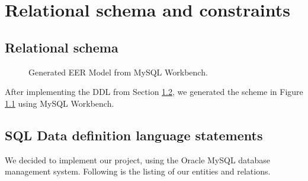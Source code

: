 %
%
%
%

\chapter{Relational schema and constraints}

\section{Relational schema}

\begin{figure}[h!]
	\centering
	\caption{Generated EER Model from MySQL Workbench.\label{fig:ddl-scheme}}
\end{figure}
After implementing the DDL from Section \ref{sec:ddl}, we generated the scheme in Figure \ref{fig:ddl-scheme} using MySQL Workbench.

\section{SQL Data definition language statements}
\label{sec:ddl}

We decided to implement our project, using the Oracle MySQL database management system. Following is the listing of our entities and relations.

\begin{center}
	
\end{center}

\begin{center}
	
\end{center}


